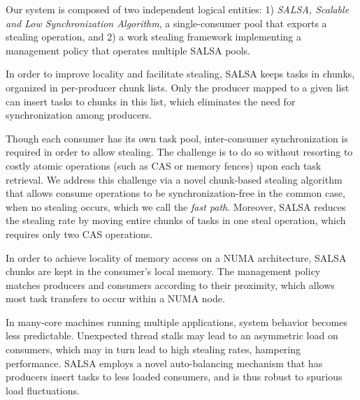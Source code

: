 Our system is composed of two independent logical entities: 1) \emph{SALSA, Scalable and Low Synchronization Algorithm}, a single-consumer pool that exports a stealing operation, and 2) a work stealing framework implementing a management policy that operates multiple SALSA pools. 

In order to improve locality and facilitate stealing, SALSA keeps tasks in chunks, organized in per-producer chunk lists. Only the producer mapped to a given list can insert
tasks to chunks in this list, which eliminates the need for synchronization among producers. 

Though each consumer has its own task pool, inter-consumer synchronization is required in order to allow stealing. The challenge is to do so without resorting to costly atomic operations (such as CAS or memory fences) upon each task retrieval. We address this challenge via a novel chunk-based stealing algorithm that allows consume operations to be synchronization-free in the common case, when no stealing occurs, which we call the \emph{fast path}. 
Moreover, SALSA reduces the stealing rate by moving entire chunks of tasks in one steal operation, which requires only two CAS operations. 

In order to achieve locality of memory access on a NUMA architecture, SALSA chunks are kept in the consumer's local memory.
The management policy matches producers and consumers according to their proximity, 
which allows most task transfers to occur within a NUMA node.

In many-core machines running multiple applications, system behavior
becomes less predictable. Unexpected thread stalls may lead
to an asymmetric load on consumers, which may in turn lead to high
stealing rates, hampering performance. SALSA employs a novel
auto-balancing mechanism that has producers insert tasks to
less loaded consumers, and is thus robust to spurious load
fluctuations.

